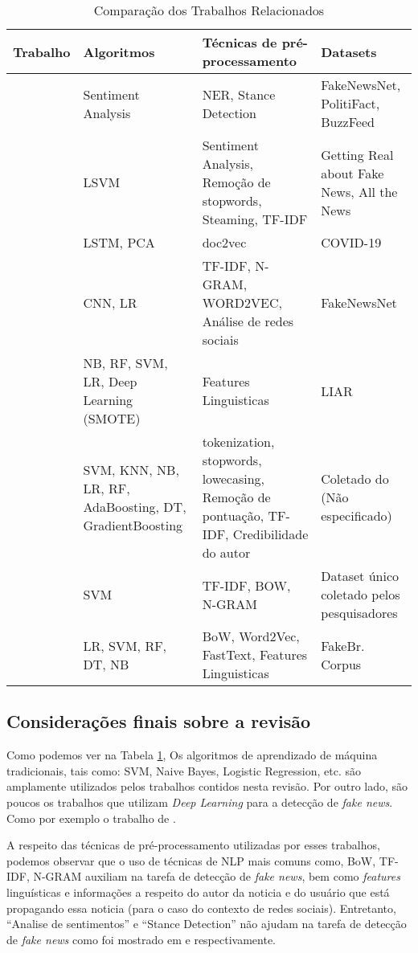\begin{table}
 \label{table:tablecomparativa1}
 \caption{Comparação dos Trabalhos Relacionados}
 \footnotesize
\begin{tabular}{p{}p{}p{}p{}}

 \toprule
 \textbf{Trabalho}& \textbf{Algoritmos} & \textbf{Técnicas de pré-processamento}&\textbf{Datasets}\\
 \midrule
 \citet{parikh2019}   &  Sentiment Analysis   & NER, Stance Detection & FakeNewsNet, PolitiFact, BuzzFeed  \\
 \citet{baarir2020}&   LSVM  & Sentiment Analysis, Remoção de stopwords, Steaming, TF-IDF   & Getting Real about Fake News, All the News \\
 \citet{DeMagistris2022} & LSTM, PCA & doc2vec & COVID-19  \\
 \citet{Wu2021530}  & CNN, LR & TF-IDF, N-GRAM, WORD2VEC, Análise de redes sociais  & FakeNewsNet \\
 \citet{Mouratidis20211}& NB, RF, SVM, LR, Deep Learning (SMOTE)    & Features Linguisticas & LIAR \\
 \citet{SelvaBirunda2021406}&  SVM, KNN, NB, LR, RF, AdaBoosting, DT, GradientBoosting & tokenization, stopwords, lowecasing, Remoção de pontuação, TF-IDF, Credibilidade do autor & Coletado do \cite{kaggle} (Não especificado)\\
 \citet{Setiawan2021}& SVM  & TF-IDF, BOW, N-GRAM & Dataset único coletado pelos pesquisadores \\
 \citet{Silva2020}&  LR, SVM, RF, DT, NB  & BoW, Word2Vec, FastText, Features Linguisticas & FakeBr. Corpus\\
 \bottomrule
\end{tabular}
\end{table}

\subsection{Considerações finais sobre a revisão}

Como podemos ver na Tabela \ref{table:tablecomparativa1}, Os algoritmos de aprendizado de máquina tradicionais, tais como: SVM, Naive Bayes, Logistic Regression, etc. são amplamente utilizados pelos trabalhos contidos nesta revisão. Por outro lado, são poucos os trabalhos que utilizam \textit{Deep Learning} para a detecção de \textit{fake news}. Como por exemplo o trabalho de \citet{Mouratidis20211}.

A respeito das técnicas de pré-processamento utilizadas por esses trabalhos, podemos observar que o uso de técnicas de NLP mais comuns como, BoW, TF-IDF, N-GRAM auxiliam na tarefa de detecção de \textit{fake news}, bem como \textit{features} linguísticas e informações a respeito do autor da noticia e do usuário que está propagando essa noticia (para o caso do contexto de redes sociais).  Entretanto, ``Analise de sentimentos'' e ``Stance Detection''  não ajudam na tarefa de detecção de \textit{fake news} como foi mostrado em \citet{baarir2020} e \citet{DeMagistris2022} respectivamente. 

